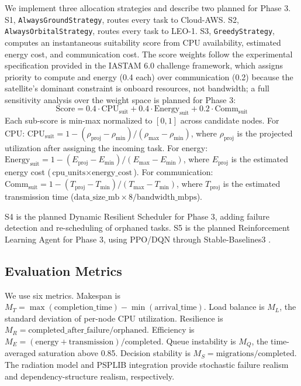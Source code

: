 \documentclass[conference]{IEEEtran}
\begin{document}
We implement three allocation strategies and describe two planned for Phase 3. S1, \texttt{AlwaysGroundStrategy}, routes every task to Cloud-AWS. S2, \texttt{AlwaysOrbitalStrategy}, routes every task to LEO-1. S3, \texttt{GreedyStrategy}, computes an instantaneous suitability score from CPU availability, estimated energy cost, and communication cost. The score weights follow the experimental specification provided in the IASTAM 6.0 challenge framework, which assigns priority to compute and energy (0.4 each) over communication (0.2) because the satellite's dominant constraint is onboard resources, not bandwidth; a full sensitivity analysis over the weight space is planned for Phase 3:
\begin{equation}
  \text{Score} = 0.4 \cdot \text{CPU}_{\text{suit}}
              + 0.4 \cdot \text{Energy}_{\text{suit}}
              + 0.2 \cdot \text{Comm}_{\text{suit}}
  \label{eq:greedy-score}
\end{equation}
Each sub-score is min-max normalized to $[0,1]$ across candidate nodes. For CPU: $\text{CPU}_{\text{suit}} = 1 - (\rho_{\text{proj}} - \rho_{\min}) / (\rho_{\max} - \rho_{\min})$, where $\rho_{\text{proj}}$ is the projected utilization after assigning the incoming task. For energy: $\text{Energy}_{\text{suit}} = 1 - (E_{\text{proj}} - E_{\min}) / (E_{\max} - E_{\min})$, where $E_{\text{proj}}$ is the estimated energy cost ($\text{cpu\_units} \times \text{energy\_cost}$). For communication: $\text{Comm}_{\text{suit}} = 1 - (T_{\text{proj}} - T_{\min}) / (T_{\max} - T_{\min})$, where $T_{\text{proj}}$ is the estimated transmission time ($\text{data\_size\_mb} \times 8 / \text{bandwidth\_mbps}$).

S4 is the planned Dynamic Resilient Scheduler for Phase 3, adding failure detection and re-scheduling of orphaned tasks. S5 is the planned Reinforcement Learning Agent for Phase 3, using PPO/DQN through Stable-Baselines3 \cite{stable-baselines3}.

\subsection{Evaluation Metrics}
\label{sec:metrics}

We use six metrics. Makespan is $M_T = \max(\mathrm{completion\_time}) - \min(\mathrm{arrival\_time})$. Load balance is $M_L$, the standard deviation of per-node CPU utilization. Resilience is $M_R = \mathrm{completed\_after\_failure} / \mathrm{orphaned}$. Efficiency is $M_E = (\mathrm{energy} + \mathrm{transmission}) / \mathrm{completed}$. Queue instability is $M_Q$, the time-averaged saturation above 0.85. Decision stability is $M_S = \mathrm{migrations} / \mathrm{completed}$. The radiation model and PSPLIB integration provide stochastic failure realism and dependency-structure realism, respectively.
\end{document}
